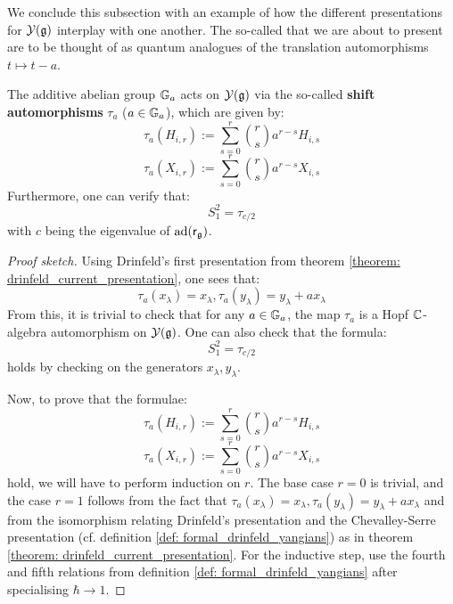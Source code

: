         We conclude this subsection with an example of how the different presentations for $\mathcal{Y}(\mathfrak{g})$ interplay with one another. The so-called  that we are about to present are to be thought of as quantum analogues of the translation automorphisms $t \mapsto t - a$.
        \begin{proposition} \label{prop: drinfeld_yangians_shift_automorphisms}
            \cite[Proposition 12.1.5]{chari_pressley_quantum_groups} The additive abelian group $\mathbb{G}_a$ acts on $\mathcal{Y}(\mathfrak{g})$ via the so-called \textbf{shift automorphisms} $\tau_a$ ($a \in \mathbb{G}_a$), which are given by:
                $$\tau_a(H_{i, r}) := \sum_{s = 0}^r \binom{r}{s} a^{r - s} H_{i, s}$$
                $$\tau_a(X_{i, r}) := \sum_{s = 0}^r \binom{r}{s} a^{r - s} X_{i, s}$$
            Furthermore, one can verify that:
                $$S_1^2 = \tau_{c/2}$$
            with $c$ being the eigenvalue of $\mathrm{ad}(\mathsf{r}_{\mathfrak{g}})$.
        \end{proposition}
            \begin{proof}[Proof sketch]
                Using Drinfeld's first presentation from theorem \ref{theorem: drinfeld_current_presentation}, one sees that:
                    $$\tau_a(x_{\lambda}) = x_{\lambda}, \tau_a(y_{\lambda}) = y_{\lambda} + a x_{\lambda}$$
                From this, it is trivial to check that for any $a \in \mathbb{G}_a$, the map $\tau_a$ is a Hopf $\mathbb{C}$-algebra automorphism on $\mathcal{Y}(\mathfrak{g})$. One can also check that the formula:
                    $$S_1^2 = \tau_{c/2}$$
                holds by checking on the generators $x_{\lambda}, y_{\lambda}$. 

                Now, to prove that the formulae:
                    $$\tau_a(H_{i, r}) := \sum_{s = 0}^r \binom{r}{s} a^{r - s} H_{i, s}$$
                    $$\tau_a(X_{i, r}) := \sum_{s = 0}^r \binom{r}{s} a^{r - s} X_{i, s}$$
                hold, we will have to perform induction on $r$. The base case $r = 0$ is trivial, and the case $r = 1$ follows from the fact that $\tau_a(x_{\lambda}) = x_{\lambda}, \tau_a(y_{\lambda}) = y_{\lambda} + a x_{\lambda}$ and from the isomorphism relating Drinfeld's presentation and the Chevalley-Serre presentation (cf. definition \ref{def: formal_drinfeld_yangians}) as in theorem \ref{theorem: drinfeld_current_presentation}. For the inductive step, use the fourth and fifth relations from definition \ref{def: formal_drinfeld_yangians} after specialising $\hbar \to 1$. 
            \end{proof}

